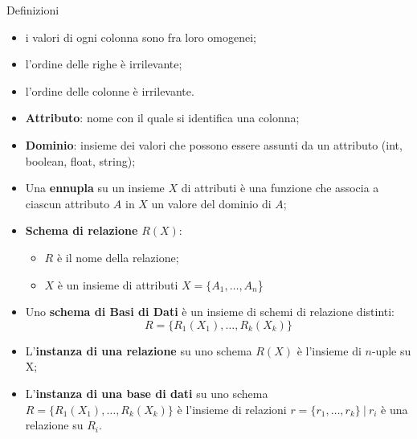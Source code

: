 \begin{frame}[allowframebreaks]{Definizioni}
\begin{itemize}
            \item i valori di ogni colonna sono fra loro omogenei;
            \item l'ordine delle righe \`e irrilevante;
            \item l'ordine delle colonne \`e irrilevante.
        \end{itemize}
        \framebreak
        \begin{itemize}
            \item \textbf{Attributo}: nome con il quale si identifica una colonna;
            \item \textbf{Dominio}: insieme dei valori che possono essere assunti da un attributo (int, boolean, float, string);
            \item Una \textbf{ennupla} su un insieme $X$ di attributi \`e una funzione che associa a ciascun attributo $A$ in $X$ un valore del dominio di $A$;
            \item \textbf{Schema di relazione} $R(X)$:
            \begin{itemize}
                \item $R$ \`e il nome della relazione;
                \item $X$ \`e un insieme di attributi $X=\{A_1, \dotsc, A_n$\}
            \end{itemize}
            \item Uno \textbf{schema di Basi di Dati} \`e un insieme di schemi di relazione distinti:
            \[ R=\{R_1(X_1),\dotsc,R_k(X_k)\}\]
            \item L'\textbf{instanza di una relazione} su uno schema $R(X)$ \`e l'insieme di $n$-uple su X;
            \item L'\textbf{instanza di una base di dati} su uno schema $R=\{R_1(X_1),\dotsc,R_k(X_k)\}$ \`e l'insieme di relazioni $r=\{r_1,\dotsc,r_k\}~|~r_i$ \`e una relazione su $R_i$.
        \end{itemize}
    \end{frame}
